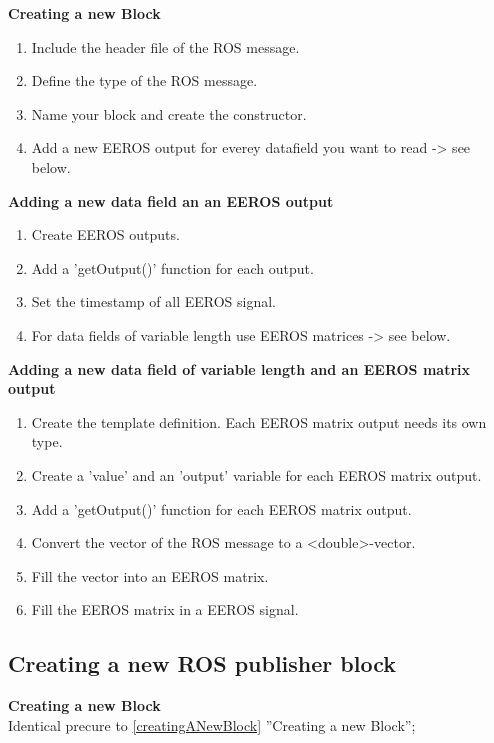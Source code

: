 \textbf{Creating a new Block}
\label{creatingANewBlock}
\begin{enumerate}[\hspace{0.5cm}{A}-1]
\item Include the header file of the ROS message.
\item Define the type of the ROS message.
\item Name your block and create the constructor.
\item Add a new EEROS output for everey datafield you want to read -> see below.
\end{enumerate}

\textbf{Adding a new data field an an EEROS output}
\begin{enumerate}[\hspace{0.5cm}{B}-1]
\item Create EEROS outputs.
\item Add a 'getOutput()' function for each output.
\item Set the timestamp of all EEROS signal.
\item For data fields of variable length use EEROS matrices -> see below.
\end{enumerate}

\textbf{Adding a new data field of variable length and an EEROS matrix output}
\begin{enumerate}[\hspace{0.5cm}{C}-1]
\item Create the template definition. Each EEROS matrix output needs its own type.
\item Create a 'value' and an 'output' variable for each EEROS matrix output.
\item Add a 'getOutput()' function for each EEROS matrix output.
\item Convert the vector of the ROS message to a <double>-vector.
\item Fill the vector into an EEROS matrix.
\item Fill the EEROS matrix in a EEROS signal.
\end{enumerate}


\subsection{Creating a new ROS publisher block}

\textbf{Creating a new Block}\\
Identical precure to \ref{creatingANewBlock} ''Creating a new Block'';

